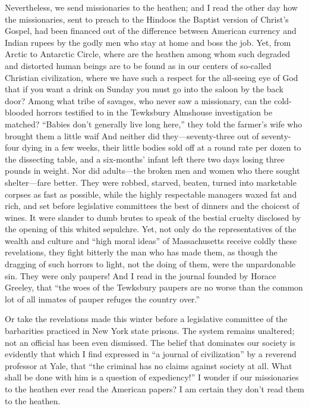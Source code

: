 \documentclass{book}
\begin{document}
Nevertheless, we send missionaries to the heathen; and I read the other day how the missionaries, sent to preach to the Hindoos the Baptist version of Christ’s Gospel, had been financed out of the difference between American currency and Indian rupees by the godly men who stay at home and boss the job. Yet, from Arctic to Antarctic Circle, where are the heathen among whom such degraded and distorted human beings are to be found as in our centers of so-called Christian civilization, where we have such a respect for the all-seeing eye of God that if you want a drink on Sunday you must go into the saloon by the back door? Among what tribe of savages, who never saw a missionary, can the cold-blooded horrors testified to in the Tewksbury Almshouse investigation be matched? “Babies don’t generally live long here,” they told the farmer’s wife who brought them a little waif And neither did they—seventy-three out of seventy-four dying in a few weeks, their little bodies sold off at a round rate per dozen to the dissecting table, and a six-months’ infant left there two days losing three pounds in weight. Nor did adults—the broken men and women who there sought shelter—fare better. They were robbed, starved, beaten, turned into marketable corpses as fast as possible, while the highly respectable managers waxed fat and rich, and set before legislative committees the best of dinners and the choicest of wines. It were slander to dumb brutes to speak of the bestial cruelty disclosed by the opening of this whited sepulchre. Yet, not only do the representatives of the wealth and culture and “high moral ideas” of Massachusetts receive coldly these revelations, they fight bitterly the man who has made them, as though the dragging of such horrors to light, not the doing of them, were the unpardonable sin. They were only paupers! And I read in the journal founded by Horace Greeley, that “the woes of the Tewksbury paupers are no worse than the common lot of all inmates of pauper refuges the country over.”

Or take the revelations made this winter before a legislative committee of the barbarities practiced in New York state prisons. The system remains unaltered; not an official has been even dismissed. The belief that dominates our society is evidently that which I find expressed in “a journal of civilization” by a reverend professor at Yale, that “the criminal has no claims against society at all. What shall be done with him is a question of expediency!” I wonder if our missionaries to the heathen ever read the American papers? I am certain they don’t read them to the heathen.
\end{document}
